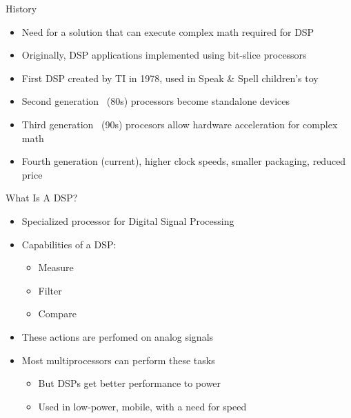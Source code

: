 \documentclass{beamer}
\begin{document}
\begin{frame}{History}
    \begin{itemize}
        \item Need for a solution that can execute complex math required for DSP
        \item Originally, DSP applications implemented using bit-slice processors
        \item First DSP created by TI in 1978, used in Speak \& Spell children's toy
        \item Second generation ~(80s) processors become standalone devices
        \item Third generation ~(90s) procesors allow hardware acceleration for complex math
        \item Fourth generation (current), higher clock speeds, smaller packaging, reduced price
    \end{itemize}
\end{frame}

\begin{frame}{What Is A DSP?}
    \begin{itemize}
        \item Specialized processor for Digital Signal Processing
        \item Capabilities of a DSP:
            \begin{itemize}
                \item Measure
                \item Filter
                \item Compare
            \end{itemize}
        \item These actions are perfomed on analog signals
        \item Most multiprocessors can perform these tasks
            \begin{itemize}
                \item But DSPs get better performance to power 
                \item Used in low-power, mobile, with a need for speed 
            \end{itemize}
     \end{itemize}
\end{frame}
\end{document}
